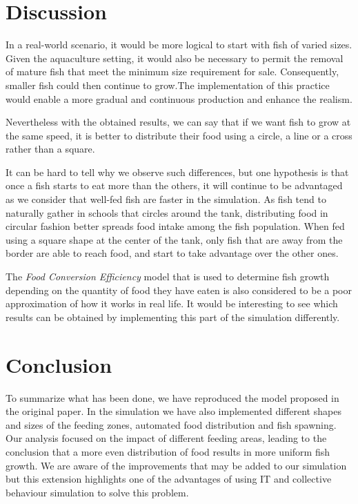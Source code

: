 \documentclass[9pt]{pnas-new}
\begin{document}
\section{Discussion}

In a real-world scenario, it would be more logical to start with fish of varied sizes. Given the aquaculture setting, it would also be necessary to permit the removal of mature fish that meet the minimum size requirement for sale. Consequently, smaller fish could then continue to grow.The implementation of this practice would enable a more gradual and continuous production and enhance the realism. 

Nevertheless with the obtained results, we can say  that if we want fish to grow at the same speed, it is better to distribute their food using a circle, a line or a cross rather than a square.


It can be hard to tell why we observe such differences, but one hypothesis is that once a fish starts to eat more than the others, it will continue to be advantaged as we consider that well-fed fish are faster in the simulation. As fish tend to naturally gather in schools that circles around the tank, distributing food in circular fashion better spreads food intake among the fish population. When fed using a square shape at the center of the tank, only fish that are away from the border are able to reach food, and start to take advantage over the other ones.

The \emph{Food Conversion Efficiency} model that is used to determine fish growth depending on the quantity of food they have eaten is also considered to be a poor approximation of how it works in real life. It would be interesting to see which results can be obtained by implementing this part of the simulation differently.

\section{Conclusion }
To summarize what has been done, we have reproduced the model proposed in the original paper. In the simulation we have also implemented different shapes and sizes of the feeding zones, automated food distribution and fish spawning. Our analysis focused on the impact of different feeding areas, leading to the conclusion that a more even distribution of food results in more uniform fish growth. We are aware of the improvements that may be added to our simulation but this extension highlights one of the advantages of using IT and collective behaviour simulation to solve this problem. 
\end{document}
